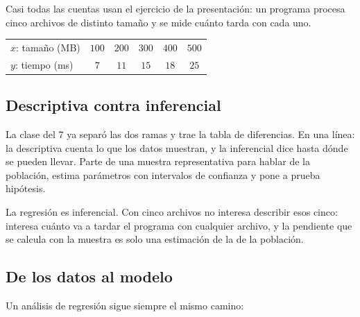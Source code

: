\documentclass[11pt,letterpaper]{article}
\begin{document}
Casi todas las cuentas usan el ejercicio de la presentación: un
programa procesa cinco archivos de distinto tamaño y se mide cuánto
tarda con cada uno.

\begin{center}
\small
\begin{tabular}{lccccc}
    \toprule
    $x$: tamaño (MB) & $100$ & $200$ & $300$ & $400$ & $500$ \\
    $y$: tiempo (ms) & $7$ & $11$ & $15$ & $18$ & $25$ \\
    \bottomrule
\end{tabular}
\end{center}


\subsection*{Descriptiva contra inferencial}

La clase del $7$ ya separó las dos ramas y trae la tabla de
diferencias. En una línea: la descriptiva cuenta lo que los datos
muestran, y la inferencial dice hasta dónde se pueden llevar. Parte de
una muestra representativa para hablar de la población, estima
parámetros con intervalos de confianza y pone a prueba hipótesis.

La regresión es inferencial. Con cinco archivos no interesa describir
esos cinco: interesa cuánto va a tardar el programa con cualquier
archivo, y la pendiente que se calcula con la muestra es solo una
estimación de la de la población.


\subsection*{De los datos al modelo}

Un análisis de regresión sigue siempre el mismo camino:
\end{document}
